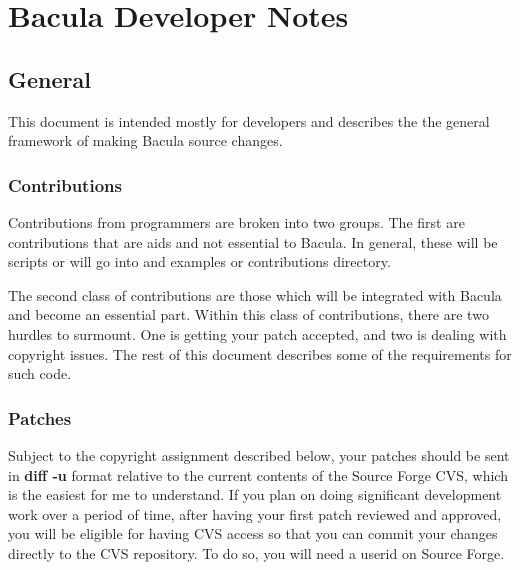 
\section*{Bacula Developer Notes}
\label{_ChapterStart10}

\subsection*{General}

This document is intended mostly for developers and describes the the general
framework of making Bacula source changes. 

\subsubsection*{Contributions}

Contributions from programmers are broken into two groups. The first are
contributions that are aids and not essential to Bacula. In general, these
will be scripts or will go into and examples or contributions directory. 

The second class of contributions are those which will be integrated with
Bacula and become an essential part. Within this class of contributions, there
are two hurdles to surmount. One is getting your patch accepted, and two is
dealing with copyright issues. The rest of this document describes some of the
requirements for such code. 

\subsubsection*{Patches}

Subject to the copyright assignment described below, your patches should be
sent in {\bf diff -u} format relative to the current contents of the Source
Forge CVS, which is the easiest for me to understand. If you plan on doing
significant development work over a period of time, after having your first
patch reviewed and approved, you will be eligible for having CVS access so
that you can commit your changes directly to the CVS repository. To do so, you
will need a userid on Source Forge. 

